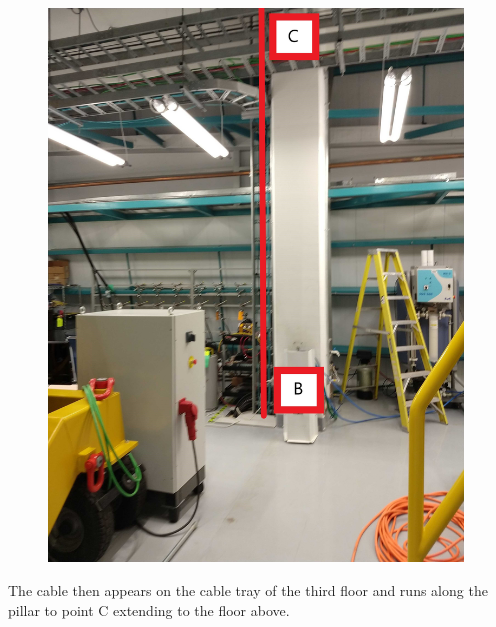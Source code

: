 \begin{figure}
  \includegraphics[width=11cm]{images/13.jpg}
  \centering
  \label{fig:jlsimon}
\end{figure}

The cable then appears on the cable tray of the third floor and runs along the pillar to point C extending to the floor above.


